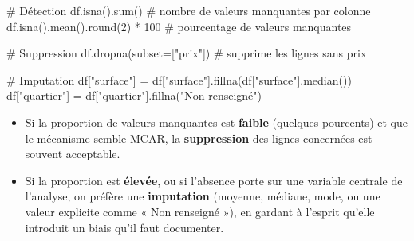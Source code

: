 \documentclass[
  french,
  letterpaper,
  open=any]{scrbook}
\newenvironment{Shaded}{\begin{snugshade}}{\end{snugshade}}
\newcommand{\BuiltInTok}[1]{\textcolor[rgb]{0.00,0.23,0.31}{#1}}
\newcommand{\CommentTok}[1]{\textcolor[rgb]{0.37,0.37,0.37}{#1}}
\newcommand{\DecValTok}[1]{\textcolor[rgb]{0.68,0.00,0.00}{#1}}
\newcommand{\NormalTok}[1]{\textcolor[rgb]{0.00,0.23,0.31}{#1}}
\newcommand{\OperatorTok}[1]{\textcolor[rgb]{0.37,0.37,0.37}{#1}}
\newcommand{\StringTok}[1]{\textcolor[rgb]{0.13,0.47,0.30}{#1}}
\providecommand{\tightlist}{%
  \setlength{\itemsep}{0pt}\setlength{\parskip}{0pt}}
\theoremstyle{definition}
\theoremstyle{definition}
\theoremstyle{remark}
\begin{document}
\begin{Shaded}
\begin{Highlighting}[]
\CommentTok{\# Détection}
\NormalTok{df.isna().}\BuiltInTok{sum}\NormalTok{()                      }\CommentTok{\# nombre de valeurs manquantes par colonne}
\NormalTok{df.isna().mean().}\BuiltInTok{round}\NormalTok{(}\DecValTok{2}\NormalTok{) }\OperatorTok{*} \DecValTok{100}      \CommentTok{\# pourcentage de valeurs manquantes}

\CommentTok{\# Suppression}
\NormalTok{df.dropna(subset}\OperatorTok{=}\NormalTok{[}\StringTok{"prix"}\NormalTok{])           }\CommentTok{\# supprime les lignes sans prix}

\CommentTok{\# Imputation}
\NormalTok{df[}\StringTok{"surface"}\NormalTok{] }\OperatorTok{=}\NormalTok{ df[}\StringTok{"surface"}\NormalTok{].fillna(df[}\StringTok{"surface"}\NormalTok{].median())}
\NormalTok{df[}\StringTok{"quartier"}\NormalTok{] }\OperatorTok{=}\NormalTok{ df[}\StringTok{"quartier"}\NormalTok{].fillna(}\StringTok{"Non renseigné"}\NormalTok{)}
\end{Highlighting}
\end{Shaded}

\begin{tcolorbox}[enhanced jigsaw, arc=.35mm, bottomrule=.15mm, bottomtitle=1mm, breakable, colback=white, colbacktitle=quarto-callout-tip-color!10!white, colframe=quarto-callout-tip-color-frame, coltitle=black, left=2mm, leftrule=.75mm, opacityback=0, opacitybacktitle=0.6, rightrule=.15mm, title=\textcolor{quarto-callout-tip-color}{\faLightbulb}\hspace{0.5em}{Comment choisir entre suppression et imputation ?}, titlerule=0mm, toprule=.15mm, toptitle=1mm]

\begin{itemize}
\tightlist
\item
  Si la proportion de valeurs manquantes est \textbf{faible} (quelques
  pourcents) et que le mécanisme semble MCAR, la \textbf{suppression}
  des lignes concernées est souvent acceptable.
\item
  Si la proportion est \textbf{élevée}, ou si l'absence porte sur une
  variable centrale de l'analyse, on préfère une \textbf{imputation}
  (moyenne, médiane, mode, ou une valeur explicite comme « Non renseigné
  »), en gardant à l'esprit qu'elle introduit un biais qu'il faut
  documenter.
\end{itemize}

\end{tcolorbox}
\end{document}
